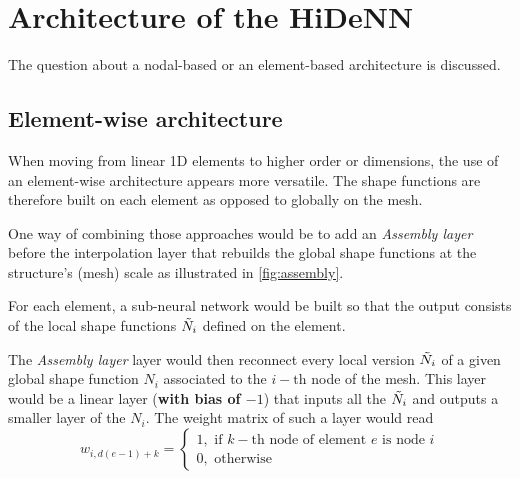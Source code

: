 \chapter[The 1$^{\text{st}}$ of February 2024 - Architecture of the HiDeNN]{Architecture of the HiDeNN}

\begin{chapabstract}
    The question about a nodal-based or  an element-based architecture is discussed.
\end{chapabstract}

\minitoc

\section{Element-wise architecture}

When moving from linear 1D elements to higher order or dimensions, the use of an element-wise architecture \parencite{liu_hidenn-fem_2023} appears more versatile. The shape functions are therefore built on each element as opposed to globally on the mesh. 

One way of combining those approaches would be to add an \emph{Assembly layer} before the interpolation layer that rebuilds the global shape functions at the structure's (mesh) scale as illustrated in \cref{fig:assembly}.

For each element, a sub-neural network would be built so that the output consists of the local shape functions $\Tilde{N}_i$ defined on the element. 


The \emph{Assembly layer} layer would then reconnect every local version $\Tilde{N}_i$ of a given global shape function $N_i$ associated to the $i-\text{th}$ node of the mesh. This layer would be a linear layer (\textbf{with bias of $-1$}) that inputs all the $\Tilde{N}_i$ and outputs a smaller layer of the $N_i$.
The weight matrix of such a layer would read
\begin{equation}
    w_{i,d\left(e-1\right)+k} = \begin{cases}
        1,\text{ if }k-\text{th node of element }e\text{ is node }i \\
        0,\text{ otherwise}
    \end{cases}
\end{equation}

